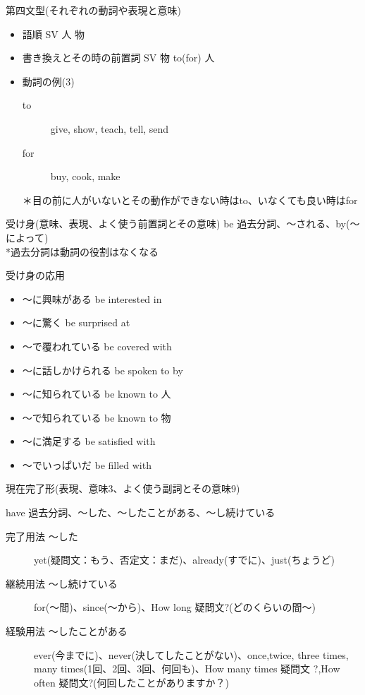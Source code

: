 \documentclass[10pt]{jsarticle}
\newcommand{\answer}[2]{{\color{orange}#2}}
\newcommand{\answer}[2]{\vspace{#1mm}}
\begin{document}
\begin{itembox}[l]{第四文型(それぞれの動詞や表現と意味)}
	\begin{itemize}
		\item 語順
		      \answer{10}{SV 人 物}
		\item 書き換えとその時の前置詞
		      \answer{10}{SV 物 to(for) 人}
		\item 動詞の例(3)
		      \answer{20}{
			      \begin{description}
				      \item[to] give, show, teach, tell, send
				      \item[for] buy, cook, make
			      \end{description}
			      ＊目の前に人がいないとその動作ができない時はto、いなくても良い時はfor
		      }
	\end{itemize}
\end{itembox}

\begin{itembox}[l]{受け身(意味、表現、よく使う前置詞とその意味)}
	\answer{10}{be 過去分詞、〜される、by(〜によって)\\
		*過去分詞は動詞の役割はなくなる}
\end{itembox}

\begin{itembox}[l]{受け身の応用}
	\begin{multicols}{2}
		\begin{itemize}
			\item 〜に興味がある \answer{5}{be interested in}
			\item 〜に驚く \answer{5}{be surprised at}
			\item 〜で覆われている \answer{5}{be covered with}
			\item 〜に話しかけられる \answer{5}{be spoken to by}
			\item 〜に知られている \answer{5}{be known to 人}
			\item 〜で知られている \answer{5}{be known to 物}
			\item 〜に満足する \answer{5}{be satisfied with}
			\item 〜でいっぱいだ \answer{5}{be filled with}
		\end{itemize}
	\end{multicols}
\end{itembox}


\begin{itembox}[l]{現在完了形(表現、意味3、よく使う副詞とその意味9)}
	\answer{30}{have 過去分詞、〜した、〜したことがある、〜し続けている
		\begin{description}
			\item[完了用法 〜した] yet(疑問文：もう、否定文：まだ)、already(すでに)、just(ちょうど)
			\item[継続用法 〜し続けている] for(〜間)、since(〜から)、How long 疑問文?(どのくらいの間〜)
			\item[経験用法 〜したことがある] ever(今までに)、never(決してしたことがない)、once,twice, three times, many times(1回、2回、3回、何回も)、How many times 疑問文 ?,How often 疑問文?(何回したことがありますか？)
		\end{description}
	}
\end{itembox}
\end{document}
